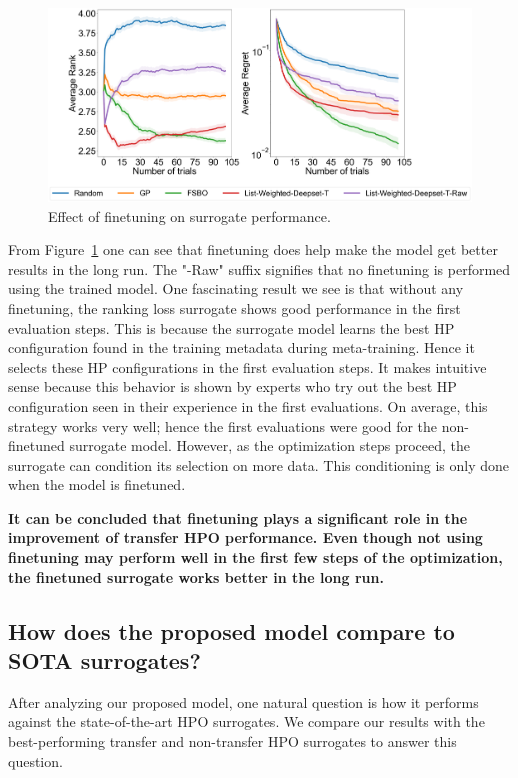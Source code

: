 \documentclass[12pt, twoside, ngerman]{report}
\begin{document}
\begin{figure}[h]
  \centering
    \includegraphics[scale=0.25]{images/FineTuningAblation}
    \caption{Effect of finetuning on surrogate performance.}
    \label{fig:FineTuningAblation}
\end{figure}

From Figure~\ref{fig:FineTuningAblation} one can see that finetuning does help make the model get better results in the long run.
The "-Raw" suffix signifies that no finetuning is performed using the trained model.
One fascinating result we see is that without any finetuning, the ranking loss surrogate shows good performance in the first evaluation steps.
This is because the surrogate model learns the best HP configuration found in the training metadata during meta-training.
Hence it selects these HP configurations in the first evaluation steps.
It makes intuitive sense because this behavior is shown by experts who try out the best HP configuration seen in their experience in the first evaluations. On average, this strategy works very well; hence the first evaluations were good for the non-finetuned surrogate model.
However, as the optimization steps proceed, the surrogate can condition its selection on more data. This conditioning is only done when the model is finetuned. 

\textbf{It can be concluded that finetuning plays a significant role in the improvement of transfer HPO performance. Even though not using finetuning may perform well in the first few steps of the optimization,  the finetuned surrogate works better in the long run.}

\subsection{How does the proposed model compare to SOTA surrogates?}
After analyzing our proposed model, one natural question is how it performs against the state-of-the-art HPO surrogates. We compare our results with the best-performing transfer and non-transfer HPO surrogates to answer this question.
\end{document}
